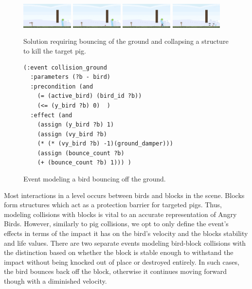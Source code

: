 \begin{figure}
\begin{center}
\includegraphics[width=0.23\textwidth]{images/under1.png}
\includegraphics[width=0.23\textwidth]{images/under2.png}
\includegraphics[width=0.23\textwidth]{images/under3.png}
\includegraphics[width=0.23\textwidth]{images/under4.png}
\end{center}
\caption{Solution requiring bouncing of the ground and collapsing a structure to kill the target pig.}
\label{fig:bounce-hit}
\end{figure}

\setlength{\belowcaptionskip}{0pt}
\begin{figure}[!ht]
\begin{center}
    \fontsize{8pt}{10pt}\selectfont
\begin{verbatim}
(:event collision_ground
  :parameters (?b - bird)
  :precondition (and
    (= (active_bird) (bird_id ?b))
    (<= (y_bird ?b) 0)  )
  :effect (and
    (assign (y_bird ?b) 1)
    (assign (vy_bird ?b) 
    (* (* (vy_bird ?b) -1)(ground_damper)))
    (assign (bounce_count ?b) 
    (+ (bounce_count ?b) 1))) )
\end{verbatim}
\caption{Event modeling a bird bouncing off the ground.}
\label{fig:ground-event}
\end{center}
\end{figure}

\smallskip
Most interactions in a level occurs between birds and blocks in the scene. Blocks form structures which act as a protection barrier for targeted pigs. Thus, modeling collisions with blocks is vital to an accurate representation of Angry Birds. However, similarly to pig collisions, we opt to only define the event's effects in terms of the impact it has on the bird's velocity and the blocks stability and life values. There are two separate events modeling bird-block collisions with the distinction based on whether the block is stable enough to withstand the impact without being knocked out of place or destroyed entirely. In such cases, the bird bounces back off the block, otherwise it continues moving forward though with a diminished velocity. 

